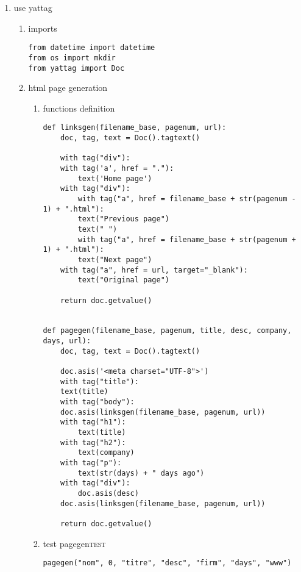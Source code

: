 \documentclass[11pt]{article}
\begin{document}
\begin{enumerate}
\item use yattag
\label{sec:org0ee0b7c}
\begin{enumerate}
\item imports
\label{sec:org9d4d9f7}
\begin{verbatim}
from datetime import datetime
from os import mkdir
from yattag import Doc
\end{verbatim}

\item html page generation
\label{sec:org9ce33dd}
\begin{enumerate}
\item functions definition
\label{sec:org1113985}
\begin{verbatim}
def linksgen(filename_base, pagenum, url):
    doc, tag, text = Doc().tagtext()

    with tag("div"):
	with tag('a', href = "."):
	    text('Home page')
	with tag("div"):
	    with tag("a", href = filename_base + str(pagenum - 1) + ".html"):
		text("Previous page")
	    text(" ")
	    with tag("a", href = filename_base + str(pagenum + 1) + ".html"):
		text("Next page")
	with tag("a", href = url, target="_blank"):
	    text("Original page")

    return doc.getvalue()


def pagegen(filename_base, pagenum, title, desc, company, days, url):
    doc, tag, text = Doc().tagtext()

    doc.asis('<meta charset="UTF-8">')
    with tag("title"):
	text(title)
    with tag("body"):
	doc.asis(linksgen(filename_base, pagenum, url))
	with tag("h1"):
	    text(title)
	with tag("h2"):
	    text(company)
	with tag("p"):
	    text(str(days) + " days ago")
	with tag("div"):
	    doc.asis(desc)
	doc.asis(linksgen(filename_base, pagenum, url))

    return doc.getvalue()
\end{verbatim}

\item test pagegen\hfill{}\textsc{test}
\label{sec:orgfdc460d}
\begin{verbatim}
pagegen("nom", 0, "titre", "desc", "firm", "days", "www")
\end{verbatim}


\end{enumerate}
\end{enumerate}
\end{enumerate}
\end{document}
